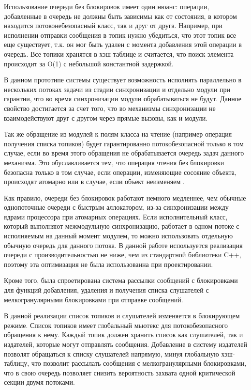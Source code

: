 Использование очереди без блокировок имеет один нюанс: операции, добавленные в 
очередь не должны быть зависимы как от состояния, в котором находится 
потоконебезопасный класс, так и друг от друга. Например, при исполнении 
отправки сообщения в топик нужно убедиться, что этот топик все еще существует, 
т.к. он мог быть удален с момента добавления этой операции в очередь. Все 
топики хранятся в хэш таблице и считается, что поиск элемента происходит за 
O(1) с небольшой константной задержкой.

В данном прототипе системы существует возможность исполнять параллельно в нескольких потоках задачи из стадии синхронизации и отдельно модули при гарантии, что во время синхронизации модули обрабатываться не будут. Данное свойство достигается за счет того, что во механизмы синхронизации не взаимодействуют друг с другом через прямые вызовы, как и модули.

Так же обращение из модулей к полям класса на чтение (например операция получения списка топиков) будет гарантированно потокобезопасной только в том случае, если во время этого обращения не обрабатывается очередь задач данного механизма. Это обуславливается тем, что операция чтения без блокировки безопасна только в том случае, если операции, изменяющие сосояние объекта, происходят атомарно  или в случае, если объект неизменяем \cite{williams2012c++}.

Как правило, очереди без блокировок работают немного медленнее, чем обычные однопоточные очереди с быстрым аллокатором, из-за синхронизации между ядрами процессора при атомарных операциях. Если исполнительный класс, который выполняют межмодульную синхронизацию, работает в одном потоке с исполняемым на данный момент модулем, то можно использовать отдельную обычную очередь для данного потока. В данной работе используется реализация очереди с производительностью не ниже, чем из стандартной библиотеки C++, поэтому эта оптимизация не была использованна при проектировании.

Кроме того, была спроетирована система рассылки сообщений с блокировками для 
функций добавления, удаления и получения списка слушателей с мелкогранулярными 
блокировками при отправке сообщений.

В данной реализации список топиков и слушателей изменяется в блокирующем режиме. Список топиков имеет глобальный мьютекс для потокобезопасного обращения к нему. Каждый топик должен хранить список как слушателей, так и издателей, которые могут отправлять сообщения. Добавление в систему издателей позволят обращаться к списку слушателей напрямую, минуя глобальную хэш-таблицу, что позволит рассылать сообщения с мелкогранулярными блокировками, что в свою очередь позволяет снизить вероятность захвата одной критической секции двумя потоками.

